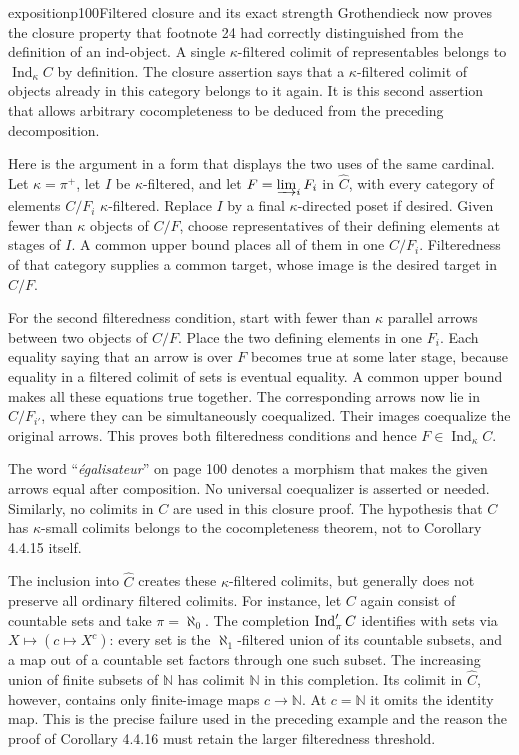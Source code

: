 \begin{dcomment}{exposition}{p100}{Filtered closure and its exact strength}
Grothendieck now proves the closure property that footnote 24 had correctly distinguished from the definition of an ind-object. A single $\kappa$-filtered colimit of representables belongs to $\operatorname{Ind}_\kappa C$ by definition. The closure assertion says that a $\kappa$-filtered colimit of objects already in this category belongs to it again. It is this second assertion that allows arbitrary cocompleteness to be deduced from the preceding decomposition.

Here is the argument in a form that displays the two uses of the same cardinal. Let $\kappa=\pi^+$, let $I$ be $\kappa$-filtered, and let $F=\varinjlim_iF_i$ in $\widehat C$, with every category of elements $C/F_i$ $\kappa$-filtered. Replace $I$ by a final $\kappa$-directed poset if desired. Given fewer than $\kappa$ objects of $C/F$, choose representatives of their defining elements at stages of $I$. A common upper bound places all of them in one $C/F_i$. Filteredness of that category supplies a common target, whose image is the desired target in $C/F$.

For the second filteredness condition, start with fewer than $\kappa$ parallel arrows between two objects of $C/F$. Place the two defining elements in one $F_i$. Each equality saying that an arrow is over $F$ becomes true at some later stage, because equality in a filtered colimit of sets is eventual equality. A common upper bound makes all these equations true together. The corresponding arrows now lie in $C/F_{i'}$, where they can be simultaneously coequalized. Their images coequalize the original arrows. This proves both filteredness conditions and hence $F\in\operatorname{Ind}_\kappa C$.

The word ``\emph{égalisateur}'' on page 100 denotes a morphism that makes the given arrows equal after composition. No universal coequalizer is asserted or needed. Similarly, no colimits in $C$ are used in this closure proof. The hypothesis that $C$ has $\kappa$-small colimits belongs to the cocompleteness theorem, not to Corollary 4.4.15 itself.

The inclusion into $\widehat C$ creates these $\kappa$-filtered colimits, but generally does not preserve all ordinary filtered colimits. For instance, let $C$ again consist of countable sets and take $\pi=\aleph_0$. The completion $\operatorname{Ind}'_\pi C$ identifies with sets via $X\mapsto(c\mapsto X^c)$: every set is the $\aleph_1$-filtered union of its countable subsets, and a map out of a countable set factors through one such subset. The increasing union of finite subsets of $\mathbb N$ has colimit $\mathbb N$ in this completion. Its colimit in $\widehat C$, however, contains only finite-image maps $c\to\mathbb N$. At $c=\mathbb N$ it omits the identity map. This is the precise failure used in the preceding example and the reason the proof of Corollary 4.4.16 must retain the larger filteredness threshold.
\end{dcomment}



